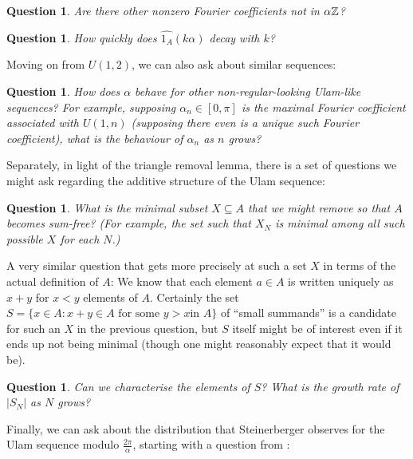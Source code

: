 \documentclass{article}
\newtheorem{question}[theorem]{Question}
\theoremstyle{definition}
\theoremstyle{remark}
\numberwithin{equation}{section}
\begin{document}
\begin{question}\label{qn:spectrum}
  Are there other nonzero Fourier coefficients not in $\alpha\mathbb{Z}$?
\end{question}

\begin{question}\label{qn:decay}
  How quickly does $\widehat{1_A}(k\alpha)$ decay with $k$?
\end{question}

Moving on from $U(1,2)$, we can also ask about similar sequences: 

\begin{question}\label{qn:other_alpha}
  How does $\alpha$ behave for other non-regular-looking Ulam-like
  sequences?  For example, supposing $\alpha_n \in [0,\pi]$ is the maximal Fourier
  coefficient associated with $U(1,n)$ (supposing there even is a
  unique such Fourier coefficient), what is the behaviour of
  $\alpha_n$ as $n$ grows?
\end{question}

Separately, in light of the triangle removal lemma, there is a set of
questions we might ask regarding the additive structure of the Ulam
sequence:

\begin{question}\label{qn:ulam_sumfree}
  What is the minimal subset $X \subseteq A$ that we might remove so
  that $A$ becomes sum-free?  (For example, the set such that $X_N$ is
  minimal among all such possible $X$ for each $N$.)
\end{question}

A very similar question that gets more precisely at such a set $X$ in
terms of the actual definition of $A$: We know that each element
$a \in A$ is written uniquely as $x+y$ for $x < y$ elements of $A$.
Certainly the set $S = \{x \in A : x + y \in A\text{ for some $y > x$
  in $A$}\}$ of ``small summands'' is a candidate for such an $X$ in
the previous question, but $S$ itself might be of interest even if it
ends up not being minimal (though one might reasonably expect that it
would be).

\begin{question}\label{qn:fulcrum}
  Can we characterise the elements of $S$?  What is the growth rate of
  $|S_N|$ as $N$ grows?
\end{question}

Finally, we can ask about the distribution that Steinerberger observes
for the Ulam sequence modulo $\frac{2\pi}{\alpha}$, starting with a
question from \cite{ulam_steinerberger}: 
\end{document}
